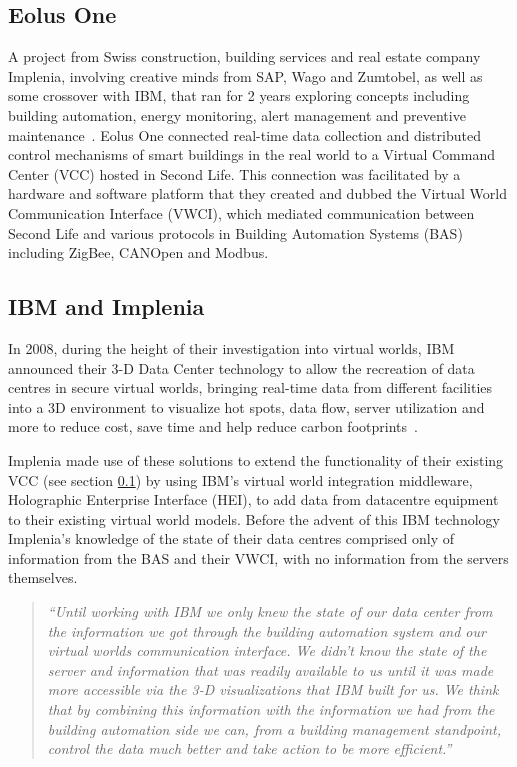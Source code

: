 \subsection{Eolus One}
\label{subsec:eolus_one}
A project from Swiss construction, building services and real estate company Implenia, involving creative minds from SAP, Wago and Zumtobel, as well as some crossover with IBM, that ran for 2 years exploring concepts including building automation, energy monitoring, alert management and preventive maintenance~\cite{Coleman2009, UgoTrade2007}. Eolus One connected real-time data collection and distributed control mechanisms of smart buildings in the real world to a Virtual Command Center (VCC) hosted in Second Life. This connection was facilitated by a hardware and software platform that they created and dubbed the Virtual World Communication Interface (VWCI), which mediated communication between Second Life and various protocols in Building Automation Systems (BAS) including ZigBee, CANOpen and Modbus.

\subsection{IBM and Implenia}
In 2008, during the height of their investigation into virtual worlds, IBM announced their 3-D Data Center technology to allow the recreation of data centres in secure virtual worlds, bringing real-time data from different facilities into a 3D environment to visualize hot spots, data flow, server utilization and more to reduce cost, save time and help reduce carbon footprints~\cite{IBM2008, Marketwire2008}.
	
Implenia made use of these solutions to extend the functionality of their existing VCC (see section \ref{subsec:eolus_one}) by using IBM's virtual world integration middleware, Holographic Enterprise Interface (HEI), to add data from datacentre equipment to their existing virtual world models. Before the advent of this IBM technology Implenia's knowledge of the state of their data centres comprised only of information from the BAS and their VWCI, with no information from the servers themselves.

\begin{quotation}
	\textit{``Until working with IBM we only knew the state of our data center from the information we got through the building automation system and our virtual worlds communication interface. We didn't know the state of the server and information that was readily available to us until it was made more accessible via the 3-D visualizations that IBM built for us. We think that by combining this information with the information we had from the building automation side we can, from a building management standpoint, control the data much better and take action to be more efficient.''}~\cite{Marketwire2008}
\end{quotation}

